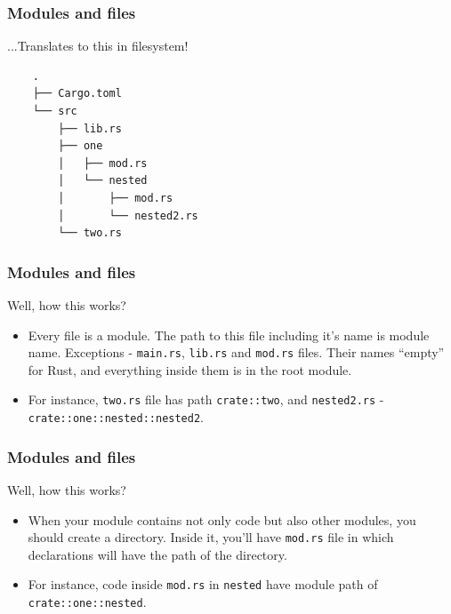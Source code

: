 \documentclass[aspectratio=1610,t]{beamer}
\begin{document}

\begin{frame}[fragile]
\frametitle{Modules and files}
...Translates to this in filesystem!

\small\begin{verbatim}
    .
    ├── Cargo.toml
    └── src
        ├── lib.rs
        ├── one
        │   ├── mod.rs
        │   └── nested
        │       ├── mod.rs
        │       └── nested2.rs
        └── two.rs
\end{verbatim}
\end{frame}


\begin{frame}[fragile]
\frametitle{Modules and files}
Well, how this works?

\begin{itemize}
    \item<1-> Every file is a module. The path to this file including it's name is module name. Exceptions - \texttt{main.rs}, \texttt{lib.rs} and \texttt{mod.rs} files. Their names ``empty'' for Rust, and everything inside them is in the root module.
    \item<2-> For instance, \texttt{two.rs} file has path \texttt{crate::two}, and \texttt{nested2.rs} - \texttt{crate::one::nested::nested2}.
\end{itemize}
\end{frame}


\begin{frame}[fragile]
\frametitle{Modules and files}
Well, how this works?

\begin{itemize}
    \item<1-> When your module contains not only code but also other modules, you should create a directory. Inside it, you'll have \texttt{mod.rs} file in which declarations will have the path of the directory.
    \item<2-> For instance, code inside \texttt{mod.rs} in \texttt{nested} have module path of \texttt{crate::one::nested}.
\end{itemize}
\end{frame}

\end{document}
